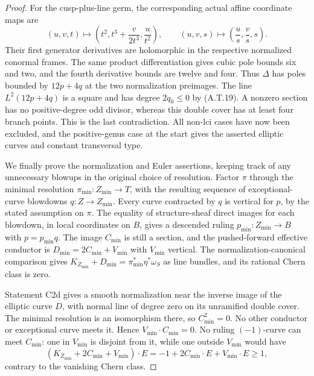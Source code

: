 \begin{proof}
For the cusp-plus-line germ, the corresponding
actual affine coordinate maps are
\[
 (u,v,t)\longmapsto
       \left(t^2,t^3+\frac{v}{2t^3},\frac{u}{t^2}\right),
 \qquad
 (u,v,s)\longmapsto\left(\frac us,\frac vs,s\right).
                                                        \tag{A.T.21}
\]
Their first generator derivatives are holomorphic
in the respective normalized conormal frames.
The same product differentiation gives cubic pole
bounds six and two, and the fourth derivative bounds
are twelve and four. Thus $\Delta$ has poles bounded
by $12p+4q$ at the two normalization preimages.
The line $L^2(12p+4q)$ is a square and has degree
$2q_0\le0$ by (A.T.19). A nonzero section has no
positive-degree odd divisor, whereas this double
cover has at least four branch points. This is the
last contradiction. All non-lci cases have now
been excluded, and the positive-genus case at the
start gives the asserted elliptic curves and constant
transversal type.

We finally prove the normalization and Euler assertions,
keeping track of any unnecessary blowups in the original
choice of resolution. Factor $\pi$ through the minimal
resolution $\pi_{\min}:Z_{\min}\to T$, with the resulting
sequence of exceptional-curve blowdowns
$q:Z\to Z_{\min}$. Every curve contracted by $q$ is
vertical for $p$, by the stated assumption on $\pi$.
The equality of structure-sheaf direct images for each
blowdown, in local coordinates on $B$, gives a descended
ruling $p_{\min}:Z_{\min}\to B$ with
$p=p_{\min}q$. The image $C_{\min}$ is still a section,
and the pushed-forward effective conductor is
$D_{\min}=2C_{\min}+V_{\min}$ with $V_{\min}$ vertical.
The normalization-canonical comparison gives
$K_{Z_{\min}}+D_{\min}=\pi_{\min}^*\eta^*\omega_S$
as line bundles, and its rational Chern class is zero.

Statement C2d gives a smooth normalization near the
inverse image of the elliptic curve $D$, with normal
line of degree zero on its unramified double cover.
The minimal resolution is an isomorphism there, so
$C_{\min}^2=0$. No other conductor or exceptional
curve meets it. Hence $V_{\min}\cdot C_{\min}=0$.
No ruling $(-1)$-curve can meet $C_{\min}$: one in
$V_{\min}$ is disjoint from it, while one outside
$V_{\min}$ would have
\[
 (K_{Z_{\min}}+2C_{\min}+V_{\min})\cdot E
       =-1+2C_{\min}\cdot E+V_{\min}\cdot E\ge1,
\]
contrary to the vanishing Chern class.


\end{proof}

